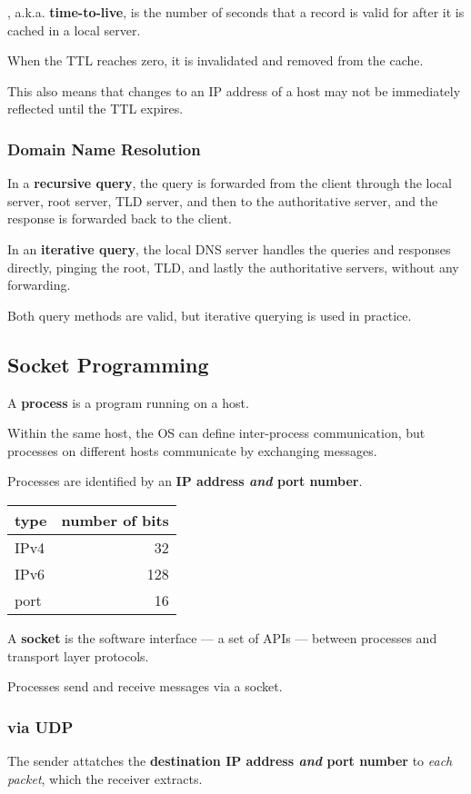 , a.k.a. \textbf{time-to-live}, is the number of seconds that a record is valid for
after it is cached in a local server.

When the TTL reaches zero, it is invalidated and removed from the cache.

This also means that changes to an IP address of a host may not be immediately reflected
until the TTL expires.

\subsubsection{Domain Name Resolution}
In a \textbf{recursive query}, the query is forwarded from the client through the local server,
root server, TLD server, and then to the authoritative server, and the response is forwarded back 
to the client.

In an \textbf{iterative query}, the local DNS server handles the queries and responses directly,
pinging the root, TLD, and lastly the authoritative servers, without any forwarding.

Both query methods are valid, but iterative querying is used in practice.


\subsection{Socket Programming}
A \textbf{process} is a program running on a host.

Within the same host, the OS can define inter-process communication, but
processes on different hosts communicate by exchanging messages.

Processes are identified by an \textbf{IP address \emph{and} port number}.

\begin{tabular}{l|r} \hline
    \textbf{type} & \textbf{number of bits} \\ \hline
    IPv4 & 32 \\
    IPv6 & 128 \\
    port & 16 \\ \hline
\end{tabular}

A \textbf{socket} is the software interface --- a set of APIs --- 
between processes and transport layer protocols.

Processes send and receive messages via a socket.

\subsubsection{via UDP}
The sender attatches the \textbf{destination IP address \emph{and} port number} to \emph{each packet},
which the receiver extracts.


